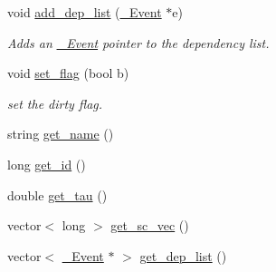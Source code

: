 \begin{DoxyCompactItemize}
void \hyperlink{classnw_1_1___event_afae58637d427d9fa023850a1f8342912}{add\+\_\+dep\+\_\+list} (\hyperlink{classnw_1_1___event}{\+\_\+\+Event} $\ast$e)
\begin{DoxyCompactList}\small\item\em Adds an \hyperlink{classnw_1_1___event}{\+\_\+\+Event} pointer to the dependency list. \end{DoxyCompactList}\item 
void \hyperlink{classnw_1_1___event_a05f533e8b22bece51864a24d1f4d8534}{set\+\_\+flag} (bool b)
\begin{DoxyCompactList}\small\item\em set the dirty flag. \end{DoxyCompactList}\item 
string \hyperlink{classnw_1_1___event_a982b9a043c4bcdd562b29cbba428760f}{get\+\_\+name} ()
\item 
long \hyperlink{classnw_1_1___event_abc5fa1db0c336b4d464f94274a015cf4}{get\+\_\+id} ()
\item 
double \hyperlink{classnw_1_1___event_ae58559a4aa257c900e3ff2e09bc0410b}{get\+\_\+tau} ()
\item 
vector$<$ long $>$ \hyperlink{classnw_1_1___event_a9b32388aa5263ab4ccd16c964c7a4a9b}{get\+\_\+sc\+\_\+vec} ()
\item 
vector$<$ \hyperlink{classnw_1_1___event}{\+\_\+\+Event} $\ast$ $>$ \hyperlink{classnw_1_1___event_a63d2e7f276e03337196eee24c0d43efc}{get\+\_\+dep\+\_\+list} ()
\end{DoxyCompactItemize}
